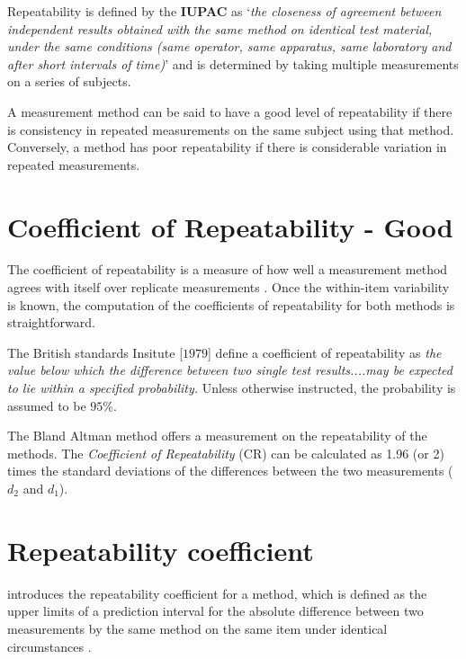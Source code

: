 \documentclass[12pt, a4paper]{report}
\theoremstyle{plain}
\theoremstyle{definition}
\theoremstyle{remark}
\begin{document}
	Repeatability is defined by the \textbf{IUPAC} as `\textit{the closeness of agreement between independent results obtained with the same method on identical test material, under the same conditions (same
		operator, same apparatus, same laboratory and after short intervals of time)}'  and is determined by taking multiple measurements on a series of subjects.
	
	A measurement method can be said to have a good level of repeatability if there is consistency in repeated measurements on the same subject using that method. Conversely, a method has poor repeatability if there is considerable variation in repeated measurements.
	
	
	
	\newpage
	\section{Coefficient of Repeatability - Good}
	The coefficient of repeatability is a measure of how well a
	measurement method agrees with itself over replicate measurements
	\citep{BA99}. Once the within-item variability is known, the
	computation of the coefficients of repeatability for both methods
	is straightforward.
	
	The British standards Insitute [$1979$] define a coefficient of
	repeatability  as \emph{the value below which the difference between two single test results....may be expected to lie within a specified probability.} Unless otherwise instructed, the
	probability is assumed to be $95\%$. 
	
	The Bland Altman method offers a measurement on the repeatability of the methods. The \emph{Coefficient of Repeatability} (CR) can be calculated as 1.96 (or 2) times the standard deviations of the differences between the two measurements ($d_2$ and $d_1$).
	
	
	
	
	
	
	
	
	
	
	
	\section{Repeatability coefficient}
	\citet{BA99} introduces the repeatability coefficient for a method, which is defined as the upper limits of a prediction interval for the absolute difference between two measurements by the same
	method on the same item under identical circumstances \citep{BXC2008}.
	
\end{document}
